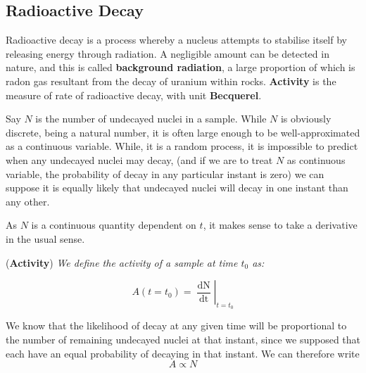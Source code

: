 \subsection{Radioactive Decay}

Radioactive decay is a process whereby a nucleus attempts to stabilise itself by releasing energy through radiation. A negligible amount can be detected in nature, and this is called \textbf{background radiation}, a large proportion of which is radon gas resultant from the decay of uranium within rocks. \textbf{Activity} is the measure of rate of radioactive decay, with unit \textbf{Becquerel}. 

Say \(N\) is the number of undecayed nuclei in a sample. While \(N\) is obviously discrete, being a natural number, it is often large enough to be well-approximated as a continuous variable. While, it is a random process, it is impossible to predict when any undecayed nuclei may decay, (and if we are to treat \(N\) as continuous variable, the probability of decay in any particular instant is zero) we can suppose it is equally likely that undecayed nuclei will decay in one instant than any other. 

As \(N\) is a continuous quantity dependent on \(t\), it makes sense to take a derivative in the usual sense. 

\begin{definition}{(\textbf{Activity})}
\textit{We define the activity of a sample at time \(t_0\) as:}

\begin{equation}
A(t = t_0) = \left. \frac{\mathop{\mathrm{d} N}}{\mathop{\mathrm{d} t}} \right|_{t = t_0}
\end{equation}
\end{definition} 

We know that the likelihood of decay at any given time will be proportional to the number of remaining undecayed nuclei at that instant, since we supposed that each have an equal probability of decaying in that instant. We can therefore write 
\begin{equation}
A \propto N
\end{equation}

